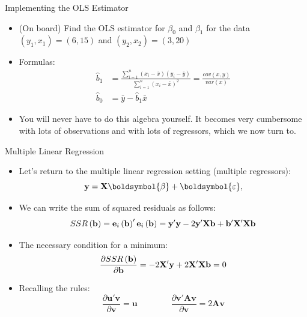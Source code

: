 \documentclass[aspectratio=169,11pt]{beamer}
\begin{document}
\begin{frame}{Implementing the OLS Estimator}
\begin{itemize}
\item (On board) Find the OLS estimator for $\beta_0$ and $\beta_1$ for the data $(y_1,x_1)=(6,15)$ and $(y_2,x_2)=(3,20)$
\medskip

\item Formulas:
\begin{align*}
\hat{b}_1 &=\frac{\sum\limits_{i=1}^n(x_i-\bar{x})(y_i-\bar{y})}{\sum\limits_{i=1}^n(x_i-\bar{x})^2}=\frac{cov\left(x,y\right)}{var\left(x\right)} \\
\hat{b}_0 & = \bar{y} - \hat{b}_1 \bar{x}
\end{align*}

\item You will never have to do this algebra yourself. It becomes very cumbersome with lots of observations and with lots of regressors,
which we now turn to.

\end{itemize}
\end{frame}


\begin{frame}{Multiple Linear Regression}
\begin{itemize}
	\item Let's return to the multiple linear regression setting (multiple regressors):
	\begin{equation*}
		{\bf y}= {\bf X} \boldsymbol{\beta} + \boldsymbol{\varepsilon},
	\end{equation*}

	\item We can write the sum of squared residuals as follows:\[
	SSR\left({\bf b}\right) = {\bf e}_i \left({\bf b}\right) '  {\bf e}_i \left({\bf b}\right) = {\bf y}'{\bf y} - 2{\bf y}'{\bf X}{\bf b} + {\bf b}' {\bf X}'{\bf X}{\bf b} 
\]


	\item The necessary condition for a minimum:\[
	\frac{\partial SSR\left({\bf b}\right)}{\partial {\bf b}} = - 2 {\bf X}' {\bf y} + 2 {\bf X}'{\bf X} {\bf b} = 0 
	\]

	\item Recalling the rules:\[
\frac{\partial\boldsymbol{u}'\boldsymbol{v}}{\partial\boldsymbol{v}}=\boldsymbol{u}\qquad\qquad\frac{\partial\boldsymbol{v}'\boldsymbol{A}\boldsymbol{v}}{\partial\boldsymbol{v}}=2\boldsymbol{A}\boldsymbol{v}
\]

\end{itemize}
\end{frame}
\end{document}
